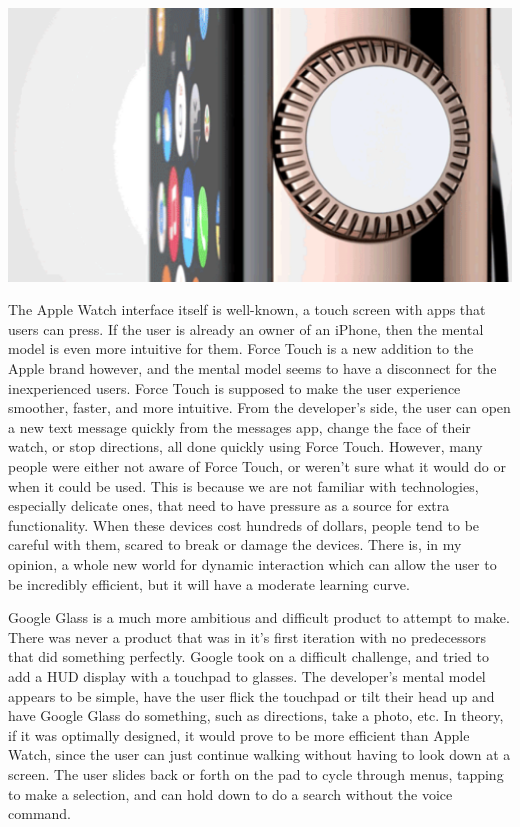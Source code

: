 \documentclass[paper=a4, fontsize=11pt]{scrartcl}	%
\numberwithin{equation}{section}															%
\numberwithin{figure}{section}																%
\numberwithin{table}{section}																%
\begin{document}
\includegraphics[scale=0.5]{applecrown}

The Apple Watch interface itself is well-known, a touch screen with apps that users can press. If the user is already an owner of an iPhone, then the mental model is even more intuitive for them. Force Touch is a new addition to the Apple brand however, and the mental model seems to have a disconnect for the inexperienced users. Force Touch is supposed to make the user experience smoother, faster, and more intuitive. From the developer's side, the user can open a new text message quickly from the messages app,  change the face of their watch, or stop directions, all done quickly using Force Touch. However, many people were either not aware of Force Touch, or weren't sure what it would do or when it could be used. This is because we are not familiar with technologies, especially delicate ones, that need to have pressure as a source for extra functionality. When these devices cost hundreds of dollars, people tend to be careful with them, scared to break or damage the devices. There is, in my opinion, a whole new world for dynamic interaction which can allow the user to be incredibly efficient, but it will have a moderate learning curve. \par

Google Glass is a much more ambitious and difficult product to attempt to make. There was never a product that was in it's first iteration with no predecessors that did something perfectly. Google took on a difficult challenge, and tried to add a HUD display with a touchpad to glasses. The developer's mental model appears to be simple, have the user flick the touchpad or tilt their head up and have Google Glass do something, such as directions, take a photo, etc. In theory, if it was optimally designed, it would prove to be more efficient than Apple Watch, since the user can just continue walking without having to look down at a screen. The user slides back or forth on the pad to cycle through menus, tapping to make a selection, and can hold down to do a search without the voice command. \par
\end{document}
